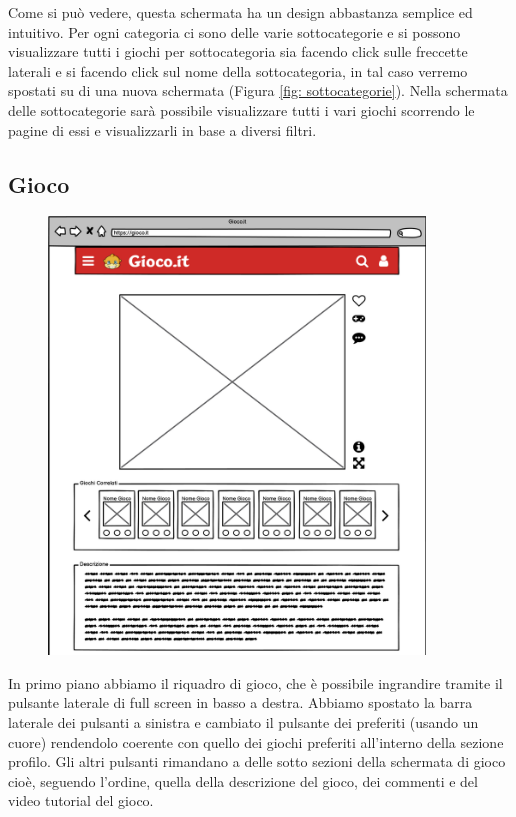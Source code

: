 \documentclass[../Report.tex]{subfiles}
\begin{document}
    Come si può vedere, questa schermata ha un design abbastanza semplice ed intuitivo. Per ogni categoria ci sono delle varie sottocategorie e si possono visualizzare tutti i giochi per sottocategoria sia facendo click sulle freccette laterali e si facendo click sul nome della sottocategoria, in tal caso verremo spostati su di una nuova schermata (Figura \ref{fig: sottocategorie}). Nella schermata delle sottocategorie sarà possibile visualizzare tutti i vari giochi scorrendo le pagine di essi e visualizzarli in base a diversi filtri.


    \subsection{Gioco}
    \begin{figure}[H]
        \includegraphics[width=10cm]{WGioco_1.png}
        \centering
    \end{figure}
    In primo piano abbiamo il riquadro di gioco, che è possibile ingrandire tramite il pulsante laterale di full screen in basso a destra. Abbiamo spostato la barra laterale dei pulsanti a sinistra e cambiato il pulsante dei preferiti (usando un cuore) rendendolo coerente con quello dei giochi preferiti all'interno della sezione profilo. Gli altri pulsanti rimandano a delle sotto sezioni della schermata di gioco cioè, seguendo l'ordine, quella della descrizione del gioco, dei commenti e del video tutorial del gioco.\\
    \\
\end{document}
